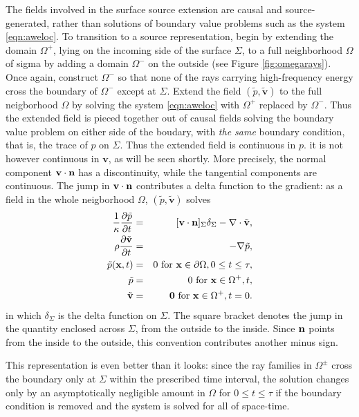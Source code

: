 \documentclass[georeport,12pt]{geophysics}
\newcommand{\bx}{\mathbf{x}}
\newcommand{\bv}{\mathbf{v}}
\begin{document}
The fields involved in the surface source extension are causal and
source-generated, rather than solutions of boundary value problems
such as the system \ref{eqn:aweloc}. To transition to a source
representation, begin by extending the domain $\Omega^+$, lying on the
incoming side of the surface $\Sigma$, to a full neighborhood $\Omega$
of sigma
by adding a domain $\Omega^-$ on the outside (see Figure
\ref{fig:omegarays}). Once again, construct $\Omega^-$ so that none of
the rays carrying high-frequency energy cross the boundary of
$\Omega^-$ except at $\Sigma$. Extend the field $(\tilde{p},\tilde{\bv})$ to the
full neigborhood $\Omega$ by solving the system \ref{eqn:aweloc} with
$\Omega^+$ replaced by $\Omega^-$. Thus the extended
field is pieced together out of causal fields solving the boundary value
problem on either side of the boudary, with {\em the same} boundary
condition, that is, the trace of $p$ on $\Sigma$. Thus the extended
field is continuous in $p$. it is not however continuous in
$\bv$, as will be seen shortly. More precisely, the normal component
$\bv\cdot {\bf n}$
has a discontinuity, while the tangential components are continuous.
The jump in
$\bv\cdot {\bf n}$ contributes a delta function to the gradient: as a
field in the whole neigborhood $\Omega$, $(\tilde{p},\tilde{\bv})$
solves
\begin{eqnarray}
\label{eqn:awebase}
  \frac{1}{\kappa}\frac{\partial \tilde{p}}{\partial t} & = & [\bv \cdot {\bf n}]_{\Sigma}\delta_{\Sigma}
                                                      - \nabla \cdot \tilde{\bv}, \nonumber \\
  \rho\frac{\partial \tilde{\bv}}{\partial t} & = & - \nabla \tilde{p},\\
  \tilde{p}(\bx,t) & = & 0 \mbox{ for } \bx \in \partial \Omega, 0 \le t \le 
  \tau,\\
  \tilde{p} & = & 0 \mbox{ for } \bx \in \Omega^+, t , \\
  \tilde{\bv} & = & {\bf 0} \mbox{ for } \bx \in \Omega^+, t = 0.       
\end{eqnarray}
in which $\delta_{\Sigma}$ is the delta function on $\Sigma$. The
square bracket denotes the jump in the quantity enclosed across
$\Sigma$, from the outside to the inside. Since ${\bf n}$ points from
the inside to the outside, this convention contributes another minus
sign.

This representation is even better than it looks: since the ray
families in $\Omega^{\pm}$ cross the boundary only at $\Sigma$ within
the prescribed time interval, the
solution changes only by an asymptotically negligible amount in
$\Omega$ for $0 \le t \le \tau$ if the boundary condition is removed
and the system is solved for all of space-time.
\end{document}
